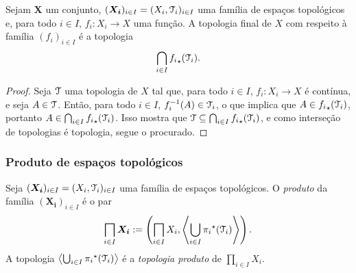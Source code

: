 \begin{proposition}
Sejam $\bm X$ um conjunto, $(\bm{X_i})_{i \in I} = (X_i,\mathcal{T}_i)_{i \in I}$ uma família de espaços topológicos e, para todo $i \in I$, $f_i: X_i \to X$ uma função. A topologia final de $X$ com respeito à família $(f_i)_{i \in I}$ é a topologia
	\begin{equation*}
	\bigcap_{i \in I} {f_i}_\star(\mathcal{T}_i).
	\end{equation*}
\end{proposition}
\begin{proof}
Seja $\mathcal{T}$ uma topologia de $X$ tal que, para todo $i \in I$, $f_i: X_i \to X$ é contínua, e seja $A \in \mathcal{T}$. Então, para todo $i \in I$, $f_i ^{-1}(A) \in \mathcal{T}_i$, o que implica que $A \in {f_i}_\star(\mathcal{T}_i)$, portanto $A \in \bigcap_{i \in I} {f_i}_\star(\mathcal{T}_i)$. Isso mostra que $\mathcal{T} \subseteq \bigcap_{i \in I} {f_i}_\star(\mathcal{T}_i)$, e como interseção de topologias é topologia, segue o procurado.
\end{proof}

\subsubsection{Produto de espaços topológicos}

\begin{definition}
Seja $(\bm{X_i})_{i \in I} = (X_i,\mathcal{T}_i)_{i \in I}$ uma família de espaços topológicos. O \emph{produto} da família $(\bm{X_i})_{i \in I}$ é o par
	\begin{equation*}
	\prod_{i \in I} \bm{X_i} := \left( \prod_{i \in I} X_i , \ger{\bigcup_{i \in I}{\pi_i}^\star(\topo_i)} \right).
	\end{equation*}
A topologia $\left\langle \bigcup_{i \in I}{\pi_i}^\star(\mathcal{T}_i) \right\rangle$ é a \emph{topologia produto} de $\prod_{i \in I} X_i$.
\end{definition}


